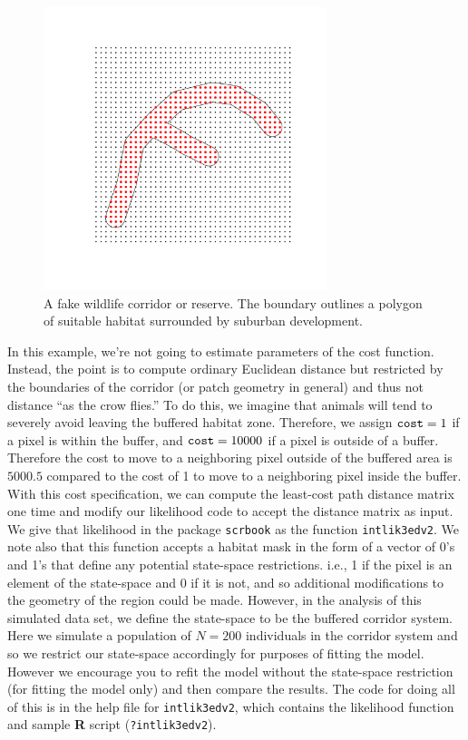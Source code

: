 \begin{figure}[h]
\begin{center}
\includegraphics[height=3.25in,width=3.25in]{Ch12-EcolDist/figs/corridor}
\end{center}
\caption{A fake wildlife corridor or reserve. The boundary outlines
  a polygon of suitable habitat surrounded by suburban development.}
\label{ecoldist.fig.corridor}
\end{figure}

In this example, we're not going to estimate parameters of the cost
function. Instead, the point is to compute ordinary Euclidean distance
but restricted by the boundaries of the corridor (or patch geometry in
general) and thus not distance ``as the crow flies.''  To do this, we
imagine that animals will tend to severely avoid leaving the buffered
habitat zone. Therefore, we assign $\mbox{\tt cost}=1$ if a pixel is
within the buffer, and $\mbox{\tt cost} = 10000$ if a pixel is outside
of a buffer. Therefore the cost to move to a neighboring pixel outside
of the buffered area is $5000.5$ compared to the cost of 1 to move to
a neighboring pixel inside the buffer.  With this cost specification,
we can compute the least-cost path distance matrix one time and modify
our likelihood code to accept the distance matrix as input. We give
that likelihood in the package \mbox{\tt scrbook} as the function
\mbox{\tt intlik3edv2}.  We note also that this function accepts a
habitat mask in the form of a vector of 0's
and 1's 
that define any potential state-space restrictions. i.e., 1 if
the pixel is an element of the state-space and 0 if it is not, and so
additional modifications to the geometry of the region could be made.
However, in the analysis of this simulated data set, we define the
state-space to be the buffered corridor system.  Here we simulate a
population of $N=200$ individuals in the corridor system and so we
restrict our state-space accordingly for purposes of fitting the
model. However we encourage you to refit the model without the
state-space restriction (for fitting the model only) and then compare
the results.  The code for doing all of this is in the help file for
\mbox{\tt intlik3edv2}, which contains the likelihood function and
sample {\bf R} script (\mbox{\tt ?intlik3edv2}).

